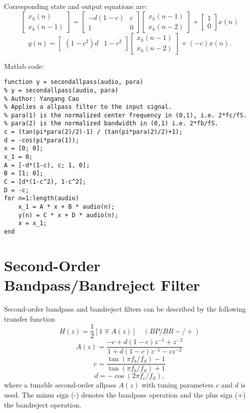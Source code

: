 \documentclass[10pt,a4paper,oneside]{beamer}
\begin{document}
\begin{frame}
Corresponding state and output equations are:
\[
\begin{bmatrix}x_h(n)\\x_h(n-1)\end{bmatrix} = \begin{bmatrix}
-d(1-c)&c\\
1&0
\end{bmatrix}
\begin{bmatrix}x_h(n-1)\\x_h(n-2)\end{bmatrix} + \begin{bmatrix}1\\0\end{bmatrix}
x(n)\]
\[
y(n) = \begin{bmatrix}(1-c^2)d&1-c^2\end{bmatrix}
\begin{bmatrix}x_h(n-1)\\x_h(n-2)\end{bmatrix} + (-c)x(n).
\]
\end{frame}
\begin{frame}[fragile]
Matlab code:
\vspace{0.1cm}
\begin{lstlisting}
function y = secondallpass(audio, para)
% y = secondallpass(audio, para)
% Author: Yangang Cao
% Applies a allpass filter to the input signal.
% para(1) is the normalized center frequency in (0,1), i.e. 2*fc/fS.
% para(2) is the normalized bandwidth in (0,1) i.e. 2*fb/fS.
c = (tan(pi*para(2)/2)-1) / (tan(pi*para(2)/2)+1);
d = -cos(pi*para(1));
x = [0; 0];
x_1 = 0;
A = [-d*(1-c), c; 1, 0];
B = [1; 0];
C = [d*(1-c^2), 1-c^2];
D = -c;
for n=1:length(audio)
    x_1 = A * x + B * audio(n);
    y(n) = C * x + D * audio(n);
    x = x_1;
end
\end{lstlisting}

\end{frame}

\section{Second-Order Bandpass/Bandreject Filter}


\begin{frame}
Second-order bandpass and bandreject filters can be described by the following transfer function
\[
H(z) = \frac{1}{2}[1 \mp A(z)]\quad(BP/BR-/+)
\]
\[
A(z) = \frac{-c + d(1-c)z^{-1} + z^{-2}}{1 + d(1-c)z^{-1} - cz^{-2}}
\]
\[
c = \frac{\tan(\pi f_b/f_S) - 1}{\tan(\pi f_b/f_S) + 1}
\]
\[
d = -\cos(2\pi f_c/f_S),
\]
where a tunable second-order allpass $A(z)$ with tuning parameters $c$ and $d$ is used. The minus sign (-) denotes the bandpass operation and the plus sign (+) the bandreject operation.
\end{frame}
\end{document}
